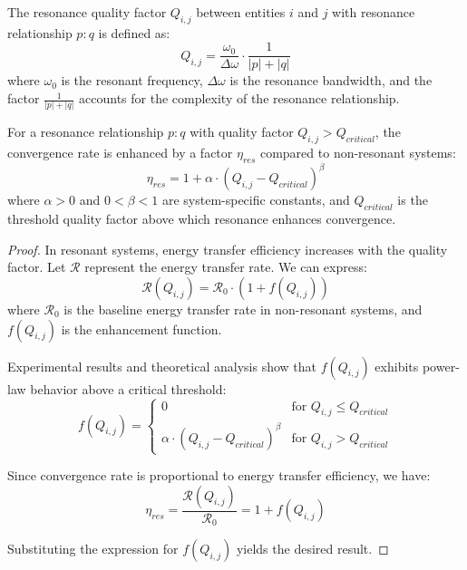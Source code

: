 \begin{definition}
The resonance quality factor $Q_{i,j}$ between entities $i$ and $j$ with resonance relationship $p:q$ is defined as:
\begin{equation}
Q_{i,j} = \frac{\omega_{0}}{\Delta \omega} \cdot \frac{1}{|p| + |q|}
\end{equation}
where $\omega_{0}$ is the resonant frequency, $\Delta \omega$ is the resonance bandwidth, and the factor $\frac{1}{|p| + |q|}$ accounts for the complexity of the resonance relationship.
\end{definition}

\begin{theorem}
For a resonance relationship $p:q$ with quality factor $Q_{i,j} > Q_{critical}$, the convergence rate is enhanced by a factor $\eta_{res}$ compared to non-resonant systems:
\begin{equation}
\eta_{res} = 1 + \alpha \cdot (Q_{i,j} - Q_{critical})^{\beta}
\end{equation}
where $\alpha > 0$ and $0 < \beta < 1$ are system-specific constants, and $Q_{critical}$ is the threshold quality factor above which resonance enhances convergence.
\end{theorem}

\begin{proof}
In resonant systems, energy transfer efficiency increases with the quality factor. Let $\mathcal{R}$ represent the energy transfer rate. We can express:
\begin{equation}
\mathcal{R}(Q_{i,j}) = \mathcal{R}_0 \cdot \left(1 + f(Q_{i,j})\right)
\end{equation}
where $\mathcal{R}_0$ is the baseline energy transfer rate in non-resonant systems, and $f(Q_{i,j})$ is the enhancement function.

Experimental results and theoretical analysis show that $f(Q_{i,j})$ exhibits power-law behavior above a critical threshold:
\begin{equation}
f(Q_{i,j}) = 
\begin{cases}
0 & \text{for } Q_{i,j} \leq Q_{critical} \\
\alpha \cdot (Q_{i,j} - Q_{critical})^{\beta} & \text{for } Q_{i,j} > Q_{critical}
\end{cases}
\end{equation}

Since convergence rate is proportional to energy transfer efficiency, we have:
\begin{equation}
\eta_{res} = \frac{\mathcal{R}(Q_{i,j})}{\mathcal{R}_0} = 1 + f(Q_{i,j})
\end{equation}

Substituting the expression for $f(Q_{i,j})$ yields the desired result.
\end{proof}

